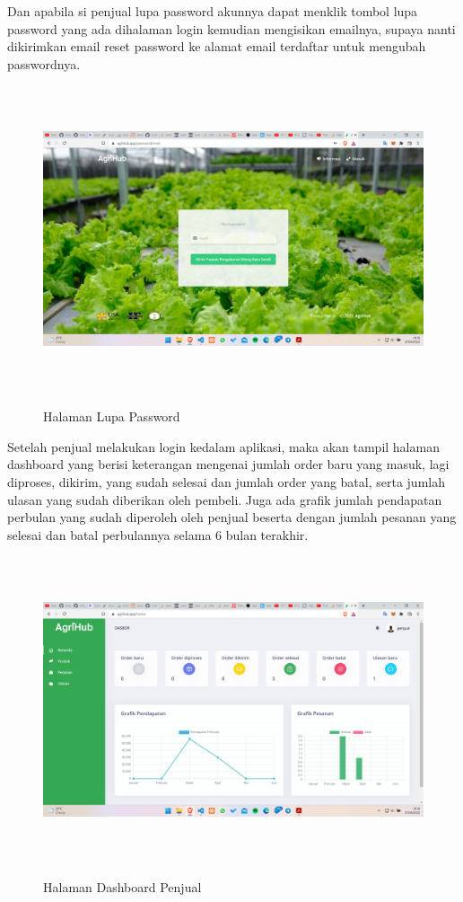 \begin{enumerate}
\begin{enumerate}
			\par Dan apabila si penjual lupa password akunnya dapat menklik tombol lupa password yang ada dihalaman login kemudian mengisikan emailnya, supaya nanti dikirimkan email reset password ke alamat email terdaftar untuk mengubah passwordnya.

			\begin{figure}[H]
				\centering
				{\includegraphics [width = 14.3cm, height= 9cm]{gambar/lupa_password}}
				\caption{Halaman Lupa Password}
				\label{lupa_password}
			\end{figure}

			\par Setelah penjual melakukan login kedalam aplikasi, maka akan tampil halaman dashboard yang berisi keterangan mengenai jumlah order baru yang masuk, lagi diproses, dikirim, yang sudah selesai dan jumlah order yang batal, serta jumlah ulasan yang sudah diberikan oleh pembeli. Juga ada grafik jumlah pendapatan perbulan yang sudah diperoleh oleh penjual beserta dengan jumlah pesanan yang selesai dan batal perbulannya selama 6 bulan terakhir.

			\begin{figure}[H]
				\centering
				{\includegraphics [width = 14.3cm, height= 9cm]{gambar/penjual/dashboard_penjual}}
				\caption{Halaman Dashboard Penjual}
				\label{dashboard_penjual}
			\end{figure}


\end{enumerate}
\end{enumerate}
